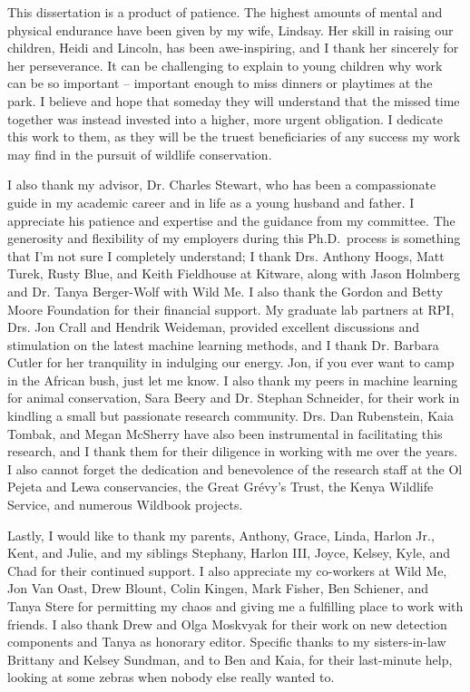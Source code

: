 
\noindent This dissertation is a product of patience.  The highest amounts of mental and physical endurance have been given by my wife, Lindsay.  Her skill in raising our children, Heidi and Lincoln, has been awe-inspiring, and I thank her sincerely for her perseverance.  It can be challenging to explain to young children why work can be so important -- important enough to miss dinners or playtimes at the park.  I believe and hope that someday they will understand that the missed time together was instead invested into a higher, more urgent obligation.  I dedicate this work to them, as they will be the truest beneficiaries of any success my work may find in the pursuit of wildlife conservation.

I also thank my advisor, Dr. Charles Stewart, who has been a compassionate guide in my academic career and in life as a young husband and father.  I appreciate his patience and expertise and the guidance from my committee.  The generosity and flexibility of my employers during this Ph.D.\ process is something that I'm not sure I completely understand; I thank Drs. Anthony Hoogs, Matt Turek, Rusty Blue, and Keith Fieldhouse at Kitware, along with Jason Holmberg and Dr. Tanya Berger-Wolf with Wild Me.  I also thank the Gordon and Betty Moore Foundation for their financial support.  My graduate lab partners at RPI, Drs. Jon Crall and Hendrik Weideman, provided excellent discussions and stimulation on the latest machine learning methods, and I thank Dr. Barbara Cutler for her tranquility in indulging our energy.  Jon, if you ever want to camp in the African bush, just let me know.  I also thank my peers in machine learning for animal conservation, Sara Beery and Dr. Stephan Schneider, for their work in kindling a small but passionate research community.  Drs. Dan Rubenstein, Kaia Tombak, and Megan McSherry have also been instrumental in facilitating this research, and I thank them for their diligence in working with me over the years.  I also cannot forget the dedication and benevolence of the research staff at the Ol Pejeta and Lewa conservancies, the Great Gr\'evy's Trust, the Kenya Wildlife Service, and numerous Wildbook projects.

Lastly, I would like to thank my parents, Anthony, Grace, Linda, Harlon Jr., Kent, and Julie, and my siblings Stephany, Harlon III, Joyce, Kelsey, Kyle, and Chad for their continued support.  I also appreciate my co-workers at Wild Me, Jon Van Oast, Drew Blount, Colin Kingen, Mark Fisher, Ben Schiener, and Tanya Stere for permitting my chaos and giving me a fulfilling place to work with friends.  I also thank Drew and Olga Moskvyak for their work on new detection components and Tanya as honorary editor.  Specific thanks to my sisters-in-law Brittany and Kelsey Sundman, and to Ben and Kaia, for their last-minute help, looking at some zebras when nobody else really wanted to.
